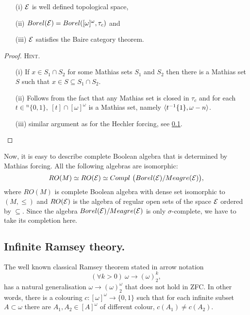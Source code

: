 \begin{proposition}
 \begin{itemize}
  \item[(i)] $\mathcal E$ is well defined topological space,
  \item[(ii)] $Borel(\mathcal E) = Borel([\omega]^\omega,\tau_c)$ and
  \item[(iii)] $\mathcal E$ satisfies the Baire category theorem.
 \end{itemize}
\end{proposition}

\begin{proof}{\scshape Hint.}
\begin{itemize}
 \item[(i)] If $x \in S_1 \cap S_2$ for some Mathias sets $S_1$ and $S_2$
	then there is a Mathias set $S$ such that $x \in S \subseteq S_1 \cap S_2$.
 \item[(ii)] Follows from the fact that any Mathias set is closed in
	$\tau_c$ and for each $t \in {}^n \{0,1\}, \ [t] \cap [\omega]^\omega$
	is a Mathias set, namely $\langle t^{-1}\{1\},\omega - n\rangle$.
 \item[(iii)] similar argument as for the Hechler forcing, see \ref{}.
\end{itemize}
\end{proof}

Now, it is easy to describe complete Boolean algebra that is determined
by Mathias forcing. All the following algebras are isomorphic:
$$
RO(M) \simeq RO(\mathcal E) \simeq Compl\ \bigl( Borel(\mathcal E) / Meagre(\mathcal E) \bigr ),
$$
where $RO(M)$ is complete Boolean algebra with dense set isomorphic to
$(M,\leq)$ and $RO(\mathcal E)$ is the algebra of regular open sets of the space $\mathcal E$
ordered by $\subseteq$. Since the algebra $Borel(\mathcal E) / Meagre(\mathcal E)$ is
only $\sigma$-complete, we have to take its completion here.


\subsection{${}$Infinite Ramsey theory.}
The well known classical Ramsey theorem stated in arrow notation
$$
(\forall k > 0) \ \omega \longrightarrow (\omega)^k_2,
$$
has a natural generalisation $\omega \rightarrow (\omega)^\omega_2$
that does not hold in ZFC. In other words, there is a colouring
$c: [\omega]^\omega \rightarrow \{0,1\}$ such that for each
infinite subset $A \subset \omega$ there are $A_1,A_2 \in [A]^\omega$
of different colour, $c(A_1) \not = c(A_2)$.

\smallskip

